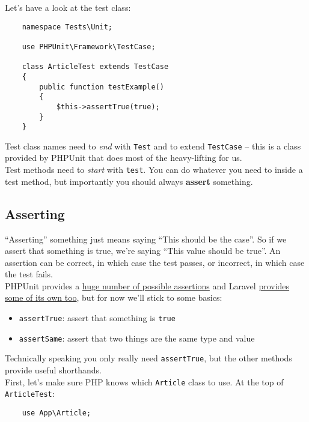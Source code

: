 Let's have a look at the test class:

\begin{verbatim}
    namespace Tests\Unit;

    use PHPUnit\Framework\TestCase;

    class ArticleTest extends TestCase
    {
        public function testExample()
        {
            $this->assertTrue(true);
        }
    }
\end{verbatim}

Test class names need to \textit{end} with \texttt{Test} and to extend \texttt{TestCase} – this is a class provided by PHPUnit that does most of the heavy-lifting for us.
\\

Test methods need to \textit{start} with \texttt{test}. You can do whatever you need to inside a test method, but importantly you should always \textbf{assert} something.

\subsection{Asserting}

``Asserting'' something just means saying ``This should be the case''. So if we assert that something is true, we're saying ``This value should be true''. An assertion can be correct, in which case the test passes, or incorrect, in which case the test fails.
\\

PHPUnit provides a \href{https://phpunit.readthedocs.io/en/9.0/assertions.html}{huge number of possible assertions} and Laravel \href{https://laravel.com/docs/master/http-tests#available-assertions}{provides some of its own too}, but for now we'll stick to some basics:

\begin{itemize}
    \item \texttt{assertTrue}: assert that something is \texttt{true}
    \item \texttt{assertSame}: assert that two things are the same type and value
\end{itemize}

Technically speaking you only really need \texttt{assertTrue}, but the other methods provide useful shorthands.
\\

First, let's make sure PHP knows which \texttt{Article} class to use. At the top of \texttt{ArticleTest}:

\begin{verbatim}
    use App\Article;
\end{verbatim}

